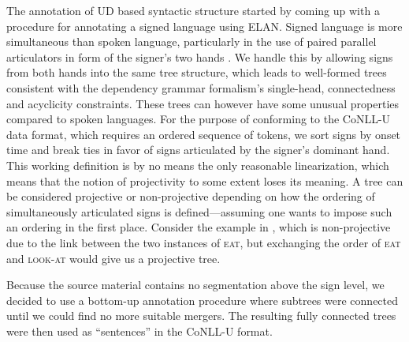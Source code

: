 \documentclass[11pt]{article}
\begin{document}
The annotation of UD based syntactic structure started by coming up with a procedure for annotating a signed language using ELAN. Signed language is more simultaneous than spoken language, particularly in the use of paired parallel articulators in form of the signer's two hands \cite{Vermeerbergen2007simultaneity}.
We handle this by allowing signs from both hands into the same tree structure,
which leads to well-formed trees consistent with the dependency grammar
formalism's single-head, connectedness and acyclicity constraints.
These trees can however have some unusual properties compared to spoken
languages.
For the purpose of conforming to the CoNLL-U data format,
which requires an ordered sequence of tokens, we sort
signs by onset time and break ties in favor of signs articulated by the
signer's dominant hand.
This working definition is by no means the only reasonable linearization,
which means that the notion of projectivity to some extent loses its meaning.
A tree can be considered projective or non-projective depending on how the
ordering of simultaneously articulated signs is defined---assuming one wants
to impose such an ordering in the first place.
Consider the example in , which is non-projective
due to the link between the two instances of \textsc{eat},
but exchanging the order of \textsc{eat} and \textsc{look-at} would
give us a projective tree.

Because the source material contains no segmentation above the sign level,
we decided to use a bottom-up annotation procedure where subtrees were
connected until we could find no more suitable mergers. The resulting fully
connected trees were then used as ``sentences'' in the CoNLL-U format.

\end{document}
